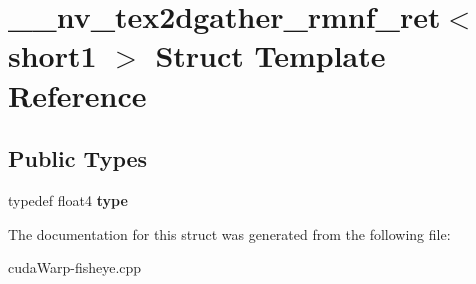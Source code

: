 \hypertarget{struct____nv__tex2dgather__rmnf__ret_3_01short1_01_4}{}\section{\+\_\+\+\_\+nv\+\_\+tex2dgather\+\_\+rmnf\+\_\+ret$<$ short1 $>$ Struct Template Reference}
\label{struct____nv__tex2dgather__rmnf__ret_3_01short1_01_4}
\subsection*{Public Types}
\begin{DoxyCompactItemize}
\item 
typedef float4 {\bfseries type}\hypertarget{struct____nv__tex2dgather__rmnf__ret_3_01short1_01_4_a9bce933113ee367693f700e49629dcb4}{}\label{struct____nv__tex2dgather__rmnf__ret_3_01short1_01_4_a9bce933113ee367693f700e49629dcb4}

\end{DoxyCompactItemize}


The documentation for this struct was generated from the following file\+:\begin{DoxyCompactItemize}
\item 
cuda\+Warp-\/fisheye.\+cpp\end{DoxyCompactItemize}
